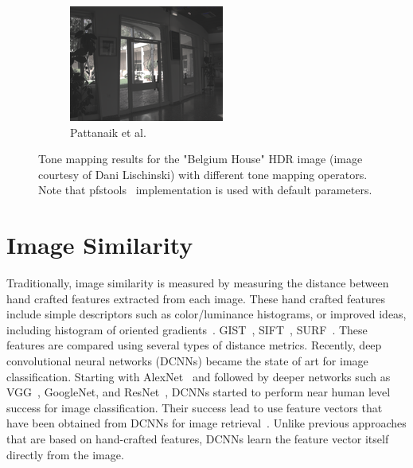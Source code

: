 \begin{figure}
\begin{subfigure}[b]{0.33\textwidth}
    \includegraphics[width=\textwidth]{figures/chapter2/tmos44/44_pattanaik00.png}
    \caption{Pattanaik et al.~\cite{pattanaik2000time}}
\end{subfigure}\hfill
\caption{Tone mapping results for the "Belgium House" HDR image (image courtesy of Dani Lischinski) with different tone mapping operators. Note that pfstools~\cite{HDRGallery} implementation is used with default parameters.}
\label{fig:tmos}
\end{figure}

\section{Image Similarity}

Traditionally, image similarity is measured by measuring the distance between hand crafted features extracted from each image. These hand crafted features include simple descriptors such as color/luminance histograms, or improved ideas, including histogram of oriented gradients~\cite{dalal2005histograms}. GIST~\cite{oliva2001modeling}, SIFT~\cite{lowe2004distinctive}, SURF~\cite{bay2006surf}. These features are compared using several types of distance metrics. Recently, deep convolutional neural networks (DCNNs) became the state of art for image classification. Starting with AlexNet~\cite{krizhevsky2012imagenet} and followed by deeper networks such as VGG~\cite{simonyan2014very}, GoogleNet\cite{szegedy2015going}, and ResNet~\cite{he2016deep}, DCNNs started to perform near human level success for image classification. Their success lead to use feature vectors that have been obtained from DCNNs for image retrieval~\cite{wan2014deep,gordo2016deep,noh2017large,radenovic2018fine}. Unlike previous approaches that are based on hand-crafted features, DCNNs learn the feature vector itself directly from the image. 


